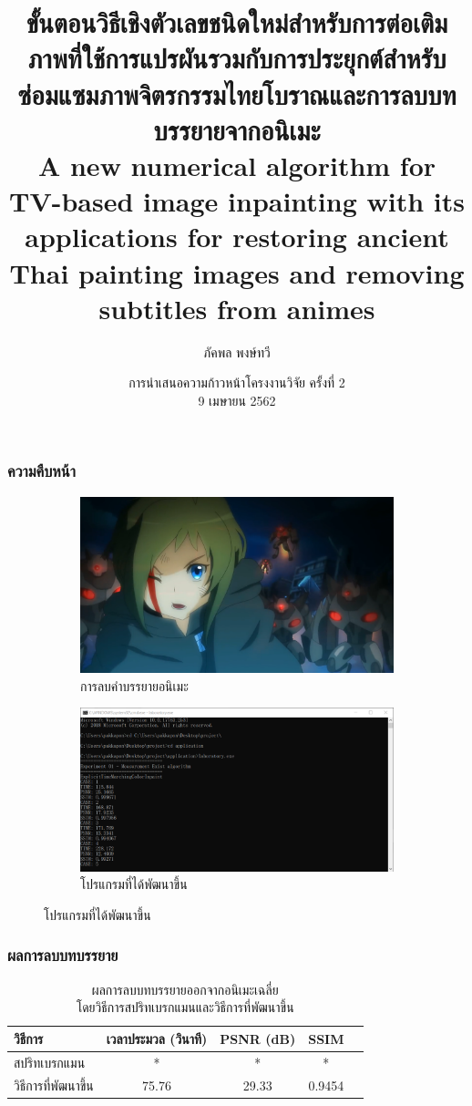 \documentclass[xcolor=dvipsnames, xetex,serif]{beamer}
\title[วิธีเชิงตัวเลขสำหรับต่อเติมภาพ]{\normalsize{ขั้นตอนวิธีเชิงตัวเลขชนิดใหม่สำหรับการต่อเติมภาพที่ใช้การแปรผันรวมกับการประยุกต์สำหรับซ่อมแซมภาพจิตรกรรมไทยโบราณและการลบบทบรรยายจากอนิเมะ\\A new numerical algorithm for TV-based image inpainting with its applications for restoring ancient Thai painting images and removing subtitles from animes}}
\author[ภัคพล]{ภัคพล พงษ์ทวี}
\institute[SU]{
 	ภาควิชาคณิตศาสตร์\\
 	มหาวิทยาลัยศิลปากร \\}
\date[Project Progression]{การนำเสนอความก้าวหน้าโครงงานวิจัย ครั้งที่ 2\\
 	9 เมษายน 2562}
\numberwithin{equation}{section}
\begin{document}
 		\begin{frame}
 			\titlepage 
		 \end{frame}
		 \begin{frame}
			\frametitle{ความคืบหน้า}
			\centering
			\begin{figure}
				\begin{subfigure}{0.4\linewidth}
					\centering
					\includegraphics[width=0.8\linewidth]{images/inori-preview.png}
					\caption*{{\large การลบคำบรรยายอนิเมะ}}
				\end{subfigure}
				\begin{subfigure}{0.4\linewidth}
					\centering
					\includegraphics[width=0.8\linewidth]{images/software_appendix/laboratory.png}
					\caption*{{\large โปรแกรมที่ได้พัฒนาขึ้น}}
				\end{subfigure}	
			\end{figure}
		\end{frame}
		\begin{frame}
			\frametitle{ผลการลบบทบรรยาย}
			\begin{table}[H]
				\centering
				\captionsetup{justification=centering}
				\begin{tabular}[ht]{|l|c|c|c|c|}
					\hline
					วิธีการ  & เวลาประมวล  (วินาที) & PSNR (dB) & SSIM \\
					\hline
					สปริทเบรกแมน & * & * & * \\
					วิธีการที่พัฒนาขึ้น & 75.76 & 29.33 & 0.9454 \\
					\hline
				\end{tabular}
				\caption{ผลการลบบทบรรยายออกจากอนิเมะเฉลี่ย\\โดยวิธีการสปริทเบรกแมนและวิธีการที่พัฒนาขึ้น}
			\end{table}	
		\end{frame}
\end{document}
